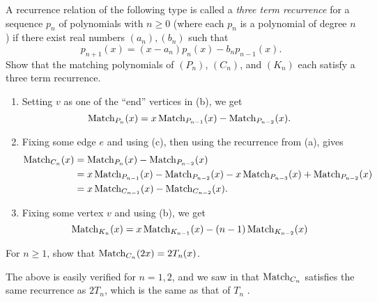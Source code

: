 
		\begin{problem}
			\label{problem: three term recurrence matching}
			A recurrence relation of the following type is called a \emph{three term recurrence} for a sequence $p_n$ of polynomials with $n \ge 0$ (where each $p_n$ is a polynomial of degree $n$) if there exist real numbers $(a_n),(b_n)$ such that 
			\[ p_{n+1}(x) = (x-a_n)p_n(x) - b_n p_{n-1}(x). \]
			Show that the matching polynomials of $(P_n)$, $(C_n)$, and $(K_n)$ each satisfy a three term recurrence.
		\end{problem}
		\begin{solution*}
			\begin{enumerate}[label=(\alph*)]
				\item Setting $v$ as one of the ``end'' vertices in (b), we get
				\[ \operatorname{Match}_{P_n}(x) = x\operatorname{Match}_{P_{n-1}}(x) - \operatorname{Match}_{P_{n-2}}(x). \]

				\item Fixing some edge $e$ and using (c), then using the recurrence from (a), gives
				\begin{align*}
					\operatorname{Match}_{C_n}(x) &= \operatorname{Match}_{P_n}(x) - \operatorname{Match}_{P_{n-2}}(x) \\
						&= x\operatorname{Match}_{P_{n-1}}(x) - \operatorname{Match}_{P_{n-2}}(x) - x \operatorname{Match}_{P_{n-3}}(x) + \operatorname{Match}_{P_{n-2}}(x) \\
						&= x\operatorname{Match}_{C_{n-1}}(x) - \operatorname{Match}_{C_{n-2}}(x).
				\end{align*}

				\item Fixing some vertex $v$ and using (b), we get
				\[ \operatorname{Match}_{K_n}(x) = x\operatorname{Match}_{K_{n-1}}(x) - (n-1)\operatorname{Match}_{K_{n-2}}(x) \]
			\end{enumerate}
		\end{solution*}


		\begin{problem}
			For $n \ge 1$, show that $\operatorname{Match}_{C_n}(2x) = 2T_n(x)$.
		\end{problem}
		\begin{solution*}
			The above is easily verified for $n=1,2$, and we saw in  that $\operatorname{Match}_{C_n}$ satisfies the same recurrence as $2T_n$, which is the same as that of $T_n$ \Cref{prop: recurrence of Tn}.
		\end{solution*}

